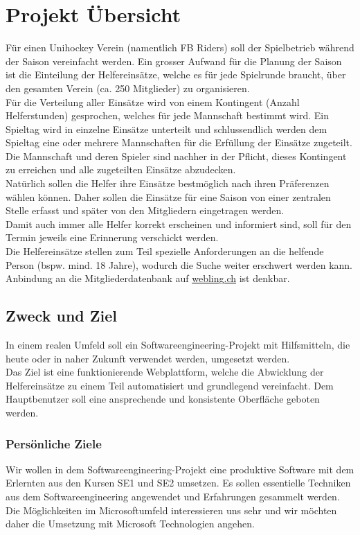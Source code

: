 \chapter{Projekt Übersicht}
Für einen Unihockey Verein (namentlich FB Riders) soll der Spielbetrieb während der Saison vereinfacht werden. Ein grosser Aufwand für die Planung der Saison ist die Einteilung der Helfereinsätze, welche es für jede Spielrunde braucht, über den gesamten Verein (ca. 250 Mitglieder) zu organisieren.
\\

Für die Verteilung aller Einsätze wird von einem Kontingent (Anzahl Helferstunden) gesprochen, welches für jede Mannschaft bestimmt wird. Ein Spieltag wird in einzelne Einsätze unterteilt und schlussendlich werden dem Spieltag eine oder mehrere Mannschaften für die Erfüllung der Einsätze zugeteilt. Die Mannschaft und deren Spieler sind nachher in der Pflicht, dieses Kontingent zu erreichen und alle zugeteilten Einsätze abzudecken.
\\
Natürlich sollen die Helfer ihre Einsätze bestmöglich nach ihren Präferenzen wählen können. Daher sollen die Einsätze für eine Saison von einer zentralen Stelle erfasst und später von den Mitgliedern eingetragen werden.
\\
Damit auch immer alle Helfer korrekt erscheinen und informiert sind, soll für den Termin jeweils eine Erinnerung verschickt werden. 
\\
Die Helfereinsätze stellen zum Teil spezielle Anforderungen an die helfende Person (bspw. mind. 18 Jahre), wodurch die Suche weiter erschwert werden kann. 
\\
Anbindung an die Mitgliederdatenbank auf \href{http://www.webling.ch/}{webling.ch} ist denkbar. 

\section{Zweck und Ziel}
In einem realen Umfeld soll ein Softwareengineering-Projekt mit Hilfsmitteln, die heute oder in naher Zukunft verwendet werden, umgesetzt werden. 
\\
Das Ziel ist eine funktionierende Webplattform, welche die Abwicklung der Helfereinsätze zu einem Teil automatisiert und grundlegend vereinfacht. Dem Hauptbenutzer soll eine ansprechende und konsistente Oberfläche geboten werden.

\subsection{Persönliche Ziele}
Wir wollen in dem Softwareengineering-Projekt eine produktive Software mit dem Erlernten aus den Kursen SE1 und SE2 umsetzen. Es sollen essentielle Techniken aus dem Softwareengineering angewendet und Erfahrungen gesammelt werden. Die Möglichkeiten im Microsoftumfeld interessieren uns sehr und wir möchten daher die Umsetzung mit Microsoft Technologien angehen.

